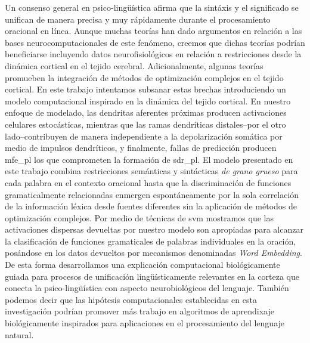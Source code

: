 Un consenso general en psico-lingüística afirma que la sintáxis y el significado se unifican de manera precisa y muy rápidamente durante el procesamiento oracional en línea.
Aunque muchas teorías han dado argumentos en relación a las bases neurocomputacionales de este fenómeno, creemos que dichas teorías podrían beneficiarse incluyendo datos neurofisiológicos en relación a restricciones desde la dinámica cortical en el tejido cerebral.
Adicionalmente, algunas teorías promueben la integración de métodos de optimización complejos en el tejido cortical.
En este trabajo intentamos subsanar estas brechas introduciendo un modelo computacional inspirado en la dinámica del tejido cortical.
En nuestro enfoque de modelado, las dendritas aferentes próximas producen activaciones celulares estocásticas, mientras que las ramas dendríticas distales--por el otro lado--contribuyen de manera independiente a la depolarización somática por medio de impulsos dendríticos, y finalmente, fallas de predicción producen \gls{mfe_pl} los que comprometen la formación de \gls{sdr_pl}.
El modelo presentado en este trabajo combina restricciones semánticas y sintácticas \emph{de grano grueso} para cada palabra en el contexto oracional hasta que la discriminación de funciones gramaticalmente relacionadas enmergen espontáneamente por la sola correlación de la información léxica desde fuentes diferentes sin la aplicación de métodos de optimización complejos.
Por medio de técnicas de \gls{svm} mostramos que las activaciones dispersas devueltas por nuestro modelo son apropiadas para alcanzar la clasificación de funciones gramaticales de palabras individuales en la oración, posándose en los datos devueltos por mecanismos denominadas \emph{Word Embedding}.
De esta forma desarrollamos una explicación computacional biológicamente guiada para procesos de unificación lingüísticamente relevantes en la corteza que conecta la psico-lingüística con aspecto neurobiológicos del lenguaje.
También podemos decir que las hipótesis computacionales establecidas en esta investigación podrían promover más trabajo en algoritmos de aprendixaje biológicamente inspirados para aplicaciones en el procesamiento del lenguaje natural.









